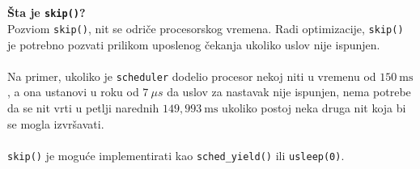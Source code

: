 \\\\
\textbf{\v{S}ta je \texttt{skip()}?}\\
Pozviom \texttt{skip()}, nit se odri\v{c}e procesorskog vremena. Radi optimizacije, \texttt{skip()} je potrebno pozvati prilikom uposlenog \v{c}ekanja ukoliko uslov nije ispunjen. 
\\\\
Na primer, ukoliko je \texttt{scheduler} dodelio procesor nekoj niti u vremenu od $150\ \mathrm{ms}$, a ona ustanovi u roku od $7\ \mu s$ da uslov za nastavak nije ispunjen, nema potrebe da se nit vrti u petlji narednih $149,993\ \mathrm{ms}$ ukoliko postoj neka druga nit koja bi se mogla izvr\v{s}avati.
\\\\
\texttt{skip()} je mogu\'{c}e implementirati kao \texttt{sched\_yield()} ili \texttt{usleep(0)}.